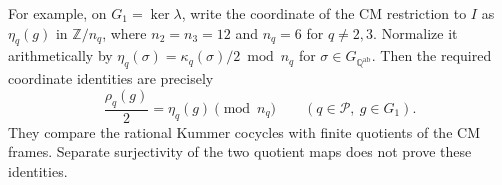 For example, on $G_1=\ker\lambda$, write the coordinate of the
CM restriction to $I$ as $\eta_q(g)$ in $\mathbb Z/n_q$, where
$n_2=n_3=12$ and $n_q=6$ for $q\ne2,3$.
Normalize it arithmetically by
$\eta_q(\sigma)=\kappa_q(\sigma)/2\bmod n_q$ for
$\sigma\in G_{\mathbb Q^{\mathrm{ab}}}$.
Then the required coordinate identities are precisely
\[
 \frac{\rho_q(g)}2=\eta_q(g)\pmod{n_q}
 \qquad(q\in\mathcal P,\ g\in G_1).
\]
They compare the rational Kummer cocycles with finite quotients
of the CM frames.  Separate surjectivity of the two quotient maps
does not prove these identities.
